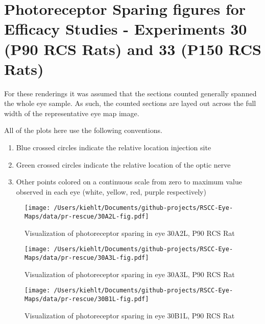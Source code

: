 \documentclass{article}
\begin{document}
\clearpage




\section{Photoreceptor Sparing figures for Efficacy Studies - Experiments 30 (P90 RCS Rats) and 33 (P150 RCS Rats)}
For these renderings it was assumed that the sections counted generally spanned the whole eye sample. As such, the counted sections are layed out across the full width of the representative eye map image.

All of the plots here use the following conventions. 
\begin{enumerate}
\item Blue crossed circles indicate the relative location injection site
\item Green crossed circles indicate the relative location of the optic nerve
\item Other points colored on a continuous scale from zero to maximum value observed in each eye (white, yellow, red, purple respectively)
\end{enumerate}
\begin{center}
\begin{figure}
\texttt{[image: /Users/kiehlt/Documents/github-projects/RSCC-Eye-Maps/data/pr-rescue/30A2L-fig.pdf]}
\caption{Visualization of photoreceptor sparing in eye 30A2L, P90 RCS Rat}
\label{fig:30A2L}
\end{figure}

\end{center}
\begin{center}
\begin{figure}
\texttt{[image: /Users/kiehlt/Documents/github-projects/RSCC-Eye-Maps/data/pr-rescue/30A3L-fig.pdf]}
\caption{Visualization of photoreceptor sparing in eye 30A3L, P90 RCS Rat}
\label{fig:30A3L}
\end{figure}

\end{center}
\begin{center}
\begin{figure}
\texttt{[image: /Users/kiehlt/Documents/github-projects/RSCC-Eye-Maps/data/pr-rescue/30B1L-fig.pdf]}
\caption{Visualization of photoreceptor sparing in eye 30B1L, P90 RCS Rat}
\label{fig:30B1L}
\end{figure}

\end{center}
\end{document}

